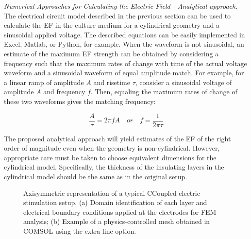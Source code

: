 \noindent \textit{Numerical Approaches for Calculating the Electric Field - Analytical approach.} The electrical circuit model described in the previous section can be used to calculate the \acs{EF} in the culture medium for a cylindrical geometry and a sinusoidal applied voltage. The described equations can be easily implemented in Excel, Matlab, or Python, for example. When the waveform is not sinusoidal, an estimate of the maximum \acs{EF} strength can be obtained by considering a frequency such that the maximum rates of change with time of the actual voltage waveform and a sinusoidal waveform of equal amplitude match. For example, for a linear ramp of amplitude $A$ and risetime $\tau$, consider a sinusoidal voltage of amplitude $A$ and frequency $f$. Then, equaling the maximum rates of change of these two waveforms gives the matching frequency:

\begin{equation}
\label{eqFrequency}
\frac{A}{\tau} = 2 \pi f A \quad or \quad f = \frac{1}{2 \pi \tau}
\end{equation}

The proposed analytical approach will yield estimates of the \acs{EF} of the right order of magnitude even when the geometry is non-cylindrical. However, appropriate care must be taken to choose equivalent dimensions for the cylindrical model. Specifically, the thickness of the insulating layers in the cylindrical model should be the same as in the original setup. \hfill \break


\begin{figure}
\caption{Axisymmetric representation of a typical \acs{CCoupled} electric stimulation setup. (a) Domain identification of each layer and electrical boundary conditions applied at the electrodes for \acs{FEM} analysis; (b) Example of a physics-controlled mesh obtained in COMSOL using the extra fine option.}
\label{fig5d5}
\end{figure}

